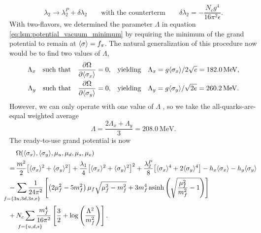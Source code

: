 \begin{equation}
	\lambda_2 \rightarrow \lambda_2^P + \delta\lambda_2 \qquad \text{with the counterterm} \qquad \delta\lambda_2 = -\frac{N_c g^4}{16 \pi^2 \epsilon} .
\end{equation}
With two-flavors, we determined the parameter $\Lambda$ in equation \eqref{eq:lsm:potential_vacuum_minimum} by requiring the minimum of the grand potential to remain at $\langle \sigma \rangle=f_\pi$.
The natural generalization of this procedure now would be to find two values of $\Lambda$,
\begin{subequations}
\begin{align}
	\Lambda_x \quad \text{such that} \quad \pdv{\Omega}{ \langle \sigma_x \rangle} = 0, & \quad \text{yielding} \quad \Lambda_x = g \langle \sigma_x \rangle / 2 \sqrt{e} = \SI{182.0}{\mega\electronvolt}, \\
	\Lambda_y \quad \text{such that} \quad \pdv{\Omega}{ \langle \sigma_y \rangle} = 0, & \quad \text{yielding} \quad \Lambda_y = g \langle \sigma_y \rangle / \sqrt{2 e} = \SI{260.2}{\mega\electronvolt}.
\end{align}
\end{subequations}
However, we can only operate with one value of $\Lambda$ , so we take the all-quarks-are-equal weighted average
\begin{equation}
	\Lambda = \frac{2 \Lambda_x + \Lambda_y}{3} = \SI{208.0}{\mega\electronvolt}.
\label{eq:lsm3f:renormalization_average}
\end{equation}
The ready-to-use grand potential is now
\begin{equation}
\begin{split}
	 & \, \Omega(\avg{\sigma_x},\avg{\sigma_y},\mu_u,\mu_d,\mu_s,\mu_e) \\
	=& \, \frac{m^2}{2} \big[\avg{\sigma_x}^2 + \avg{\sigma_y}^2\big] + \frac{\lambda_1}{4} \big[\avg{\sigma_x}^2 + \avg{\sigma_y}^2\big]^2 + \frac{\lambda_2^P}{8} \big[\avg{\sigma_x}^4 + 2 \avg{\sigma_y}^4\big] - h_x \avg{\sigma_x} - h_y \avg{\sigma_y} \\
	-& \, \smashoperator{\sum_{\vphantom{\big|} f=\{3u,3d,3s,e\}}} \frac{1}{24 \pi^2} \left[ \left( 2 \mu_f^2 - 5 m_f^2 \right) \mu_f \sqrt{\mu_f^2 - m_f^2} + 3 m_f^4 \asinh \left( \sqrt{\frac{\mu_{\smash{f}}^2}{m_f^2}-1} \right) \right] \\
	+& \, N_c \smashoperator{\sum_{\vphantom{\big|} f=\{u,d,s\}}} \frac{m_f^4}{16 \pi^2} \left[ \frac{3}{2} + \log\left(\frac{{\Lambda}^2}{m_f^2}\right) \right].
\end{split}
\label{eq:lsm3f:grand_potential}
\end{equation}

